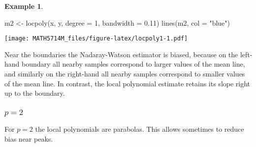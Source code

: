\documentclass[
  a4paper,
]{article}
\newenvironment{Shaded}{\begin{snugshade}}{\end{snugshade}}
\newcommand{\AttributeTok}[1]{\textcolor[rgb]{0.77,0.63,0.00}{#1}}
\newcommand{\DecValTok}[1]{\textcolor[rgb]{0.00,0.00,0.81}{#1}}
\newcommand{\FloatTok}[1]{\textcolor[rgb]{0.00,0.00,0.81}{#1}}
\newcommand{\FunctionTok}[1]{\textcolor[rgb]{0.00,0.00,0.00}{#1}}
\newcommand{\NormalTok}[1]{#1}
\newcommand{\OtherTok}[1]{\textcolor[rgb]{0.56,0.35,0.01}{#1}}
\newcommand{\StringTok}[1]{\textcolor[rgb]{0.31,0.60,0.02}{#1}}
\theoremstyle{definition}
\theoremstyle{definition}
\newtheorem{example}{Example}[section]
\theoremstyle{definition}
\theoremstyle{definition}
\theoremstyle{remark}
\begin{document}
\begin{example}
\begin{Shaded}
\begin{Highlighting}[]
\NormalTok{m2 }\OtherTok{\textless{}{-}} \FunctionTok{locpoly}\NormalTok{(x, y, }\AttributeTok{degree =} \DecValTok{1}\NormalTok{, }\AttributeTok{bandwidth =} \FloatTok{0.11}\NormalTok{)}
\FunctionTok{lines}\NormalTok{(m2, }\AttributeTok{col =} \StringTok{"blue"}\NormalTok{)}
\end{Highlighting}
\end{Shaded}

\texttt{[image: MATH5714M\_files/figure-latex/locpoly1-1.pdf]}

Near the boundaries the Nadaray-Watson estimator is biased, because on
the left-hand boundary all nearby samples correspond to larger values of the
mean line, and similarly on the right-hand all nearby samples correspond to
smaller values of the mean line. In contrast, the local polynomial estimate
retains its slope right up to the boundary.
\end{example}

\hypertarget{p-2}{%
\subsubsection*{\texorpdfstring{\(p = 2\)}{p = 2}}\label{p-2}}

For \(p=2\) the local polynomials are parabolas. This allows sometimes to reduce
bias near peaks.
\end{document}
